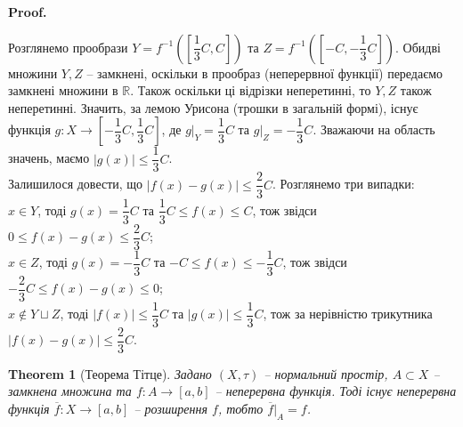 \documentclass[a4paper, 10pt]{article}
\makeatletter
\theoremstyle{theoremdd}
\newtheorem{theorem}{Theorem}[subsection]
\renewenvironment{proof}[1][Proof.\\]{\par
\pushQED{\hfill \qed}%
\normalfont \topsep6\p@\@plus6\p@\relax
\trivlist
\item\relax
{\bfseries
#1\@addpunct{.}}\hspace\labelsep\ignorespaces
}{%
\popQED\endtrivlist\@endpefalse
}
\makeatother
\begin{document}
\begin{proof}
Розглянемо прообрази $Y = f^{-1}\left(\left[\dfrac{1}{3}C,C\right]\right)$ та $Z = f^{-1}\left(\left[-C, -\dfrac{1}{3}C \right]\right)$. Обидві множини $Y,Z$ -- замкнені, оскільки в прообраз (неперервної функції) передаємо замкнені множини в $\mathbb{R}$. Також оскільки ці відрізки неперетинні, то $Y,Z$ також неперетинні. Значить, за лемою Урисона (трошки в загальній формі), існує функція $g \colon X \to \left[-\dfrac{1}{3}C, \dfrac{1}{3}C\right]$, де $g|_Y = \dfrac{1}{3}C$ та $g|_Z = -\dfrac{1}{3}C$. Зважаючи на область значень, маємо $|g(x)| \leq \dfrac{1}{3}C$. \\
Залишилося довести, що $|f(x) - g(x)| \leq \dfrac{2}{3}C$. Розглянемо три випадки:\\
$x \in Y$, тоді $g(x) = \dfrac{1}{3}C$ та $\dfrac{1}{3}C \leq f(x) \leq C$, тож звідси $0 \leq f(x) - g(x) \leq \dfrac{2}{3}C$;\\
$x \in Z$, тоді $g(x) = -\dfrac{1}{3}C$ та $-C \leq f(x) \leq -\dfrac{1}{3}C$, тож звідси $-\dfrac{2}{3}C \leq f(x) - g(x) \leq 0$;\\
$x \notin Y \sqcup Z$, тоді $|f(x)| \leq \dfrac{1}{3}C$ та $|g(x)| \leq \dfrac{1}{3}C$, тож за нерівністю трикутника $|f(x) - g(x)| \leq \dfrac{2}{3}C$.
\end{proof}

\begin{theorem}[Теорема Тітце]
Задано $(X,\tau)$ -- нормальний простір, $A \subset X$ -- замкнена множина та $f \colon A \to [a,b]$ -- неперервна функція. Тоді існує неперервна функція $\overline{f} \colon X \to [a,b]$ -- розширення $f$, тобто $\overline{f}|_{A} = f$.
\end{theorem}
\end{document}
